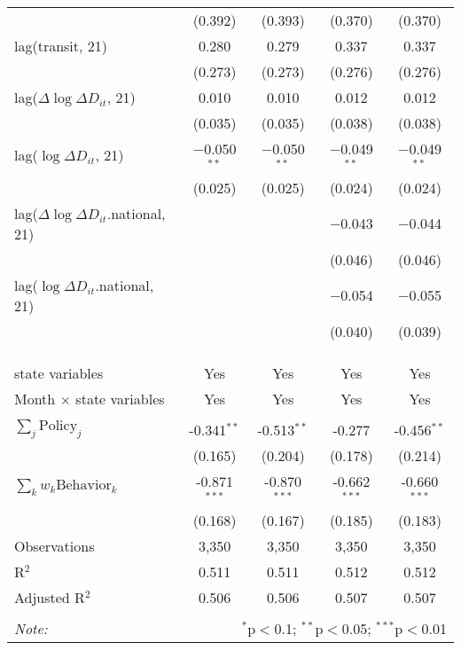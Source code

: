 \begin{tabular}{@{\extracolsep{1pt}}lcccc}
  & (0.392) & (0.393) & (0.370) & (0.370) \\ 
  lag(transit, 21) & 0.280 & 0.279 & 0.337 & 0.337 \\ 
  & (0.273) & (0.273) & (0.276) & (0.276) \\ 
  lag($\Delta \log \Delta D_{it}$, 21) & 0.010 & 0.010 & 0.012 & 0.012 \\ 
  & (0.035) & (0.035) & (0.038) & (0.038) \\ 
  lag($\log \Delta D_{it}$, 21) & $-$0.050$^{**}$ & $-$0.050$^{**}$ & $-$0.049$^{**}$ & $-$0.049$^{**}$ \\ 
  & (0.025) & (0.025) & (0.024) & (0.024) \\ 
  lag($\Delta \log \Delta D_{it}$.national, 21) &  &  & $-$0.043 & $-$0.044 \\ 
  &  &  & (0.046) & (0.046) \\ 
  lag($\log \Delta D_{it}$.national, 21) &  &  & $-$0.054 & $-$0.055 \\ 
  &  &  & (0.040) & (0.039) \\ 
   &  &  &  &  \\ 
  &  &  &  &  \\ 
 \hline \\[-1.8ex] 
state variables & Yes & Yes & Yes & Yes \\ 
Month $\times$ state variables & Yes & Yes & Yes & Yes \\ 
\hline \\[-1.8ex] 
$\sum_j \mathrm{Policy}_j$ & -0.341$^{**}$ & -0.513$^{**}$ & -0.277 & -0.456$^{**}$ \\ 
 & (0.165) & (0.204) & (0.178) & (0.214) \\ 
$\sum_k w_k \mathrm{Behavior}_k$ & -0.871$^{***}$ & -0.870$^{***}$ & -0.662$^{***}$ & -0.660$^{***}$ \\ 
 & (0.168) & (0.167) & (0.185) & (0.183) \\ 
Observations & 3,350 & 3,350 & 3,350 & 3,350 \\ 
R$^{2}$ & 0.511 & 0.511 & 0.512 & 0.512 \\ 
Adjusted R$^{2}$ & 0.506 & 0.506 & 0.507 & 0.507 \\ 
\hline 
\hline \\[-1.8ex] 
\textit{Note:}  & \multicolumn{4}{r}{$^{*}$p$<$0.1; $^{**}$p$<$0.05; $^{***}$p$<$0.01} \\ 
\end{tabular} 